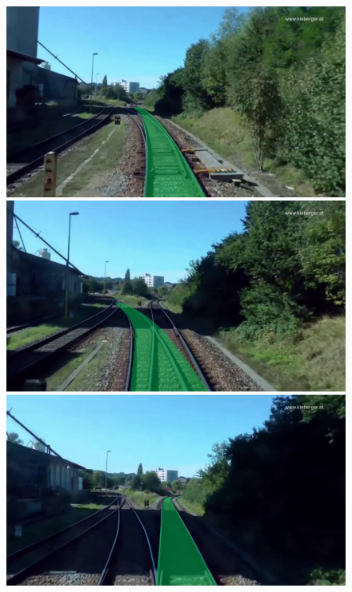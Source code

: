 \begin{figure}[H]
    \centering

    \begin{minipage}{0.328\textwidth}
        \includegraphics[width=\textwidth]{PICs/Baselinepaper/limitation_1.png}
    \end{minipage}
    \hfill
    \begin{minipage}{0.328\textwidth}
        \includegraphics[width=\textwidth]{PICs/Baselinepaper/limitation_3.png}
    \end{minipage}
    \hfill
    \begin{minipage}{0.328\textwidth}
        \includegraphics[width=\textwidth]{PICs/Baselinepaper/limitation_5.png}
    \end{minipage}


\end{figure}
